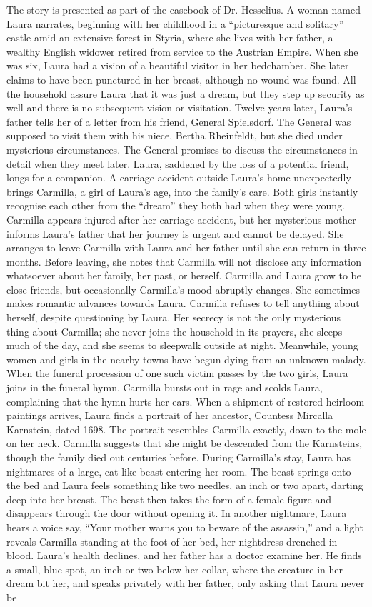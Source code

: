 \documentclass{article} %
\begin{document}
The story is presented as part of the casebook of Dr. Hesselius. A woman named Laura narrates, beginning with her childhood in a ``picturesque and solitary'' castle amid an extensive forest in Styria, where she lives with her father, a wealthy English widower retired from service to the Austrian Empire. When she was six, Laura had a vision of a beautiful visitor in her bedchamber. She later claims to have been punctured in her breast, although no wound was found. All the household assure Laura that it was just a dream, but they step up security as well and there is no subsequent vision or visitation. Twelve years later, Laura's father tells her of a letter from his friend, General Spielsdorf. The General was supposed to visit them with his niece, Bertha Rheinfeldt, but she died under mysterious circumstances. The General promises to discuss the circumstances in detail when they meet later. Laura, saddened by the loss of a potential friend, longs for a companion. A carriage accident outside Laura's home unexpectedly brings Carmilla, a girl of Laura's age, into the family's care. Both girls instantly recognise each other from the ``dream'' they both had when they were young. Carmilla appears injured after her carriage accident, but her mysterious mother informs Laura's father that her journey is urgent and cannot be delayed. She arranges to leave Carmilla with Laura and her father until she can return in three months. Before leaving, she notes that Carmilla will not disclose any information whatsoever about her family, her past, or herself. Carmilla and Laura grow to be close friends, but occasionally Carmilla's mood abruptly changes. She sometimes makes romantic advances towards Laura. Carmilla refuses to tell anything about herself, despite questioning by Laura. Her secrecy is not the only mysterious thing about Carmilla; she never joins the household in its prayers, she sleeps much of the day, and she seems to sleepwalk outside at night. Meanwhile, young women and girls in the nearby towns have begun dying from an unknown malady. When the funeral procession of one such victim passes by the two girls, Laura joins in the funeral hymn. Carmilla bursts out in rage and scolds Laura, complaining that the hymn hurts her ears. When a shipment of restored heirloom paintings arrives, Laura finds a portrait of her ancestor, Countess Mircalla Karnstein, dated 1698. The portrait resembles Carmilla exactly, down to the mole on her neck. Carmilla suggests that she might be descended from the Karnsteins, though the family died out centuries before. During Carmilla's stay, Laura has nightmares of a large, cat-like beast entering her room. The beast springs onto the bed and Laura feels something like two needles, an inch or two apart, darting deep into her breast. The beast then takes the form of a female figure and disappears through the door without opening it. In another nightmare, Laura hears a voice say, ``Your mother warns you to beware of the assassin,'' and a light reveals Carmilla standing at the foot of her bed, her nightdress drenched in blood. Laura's health declines, and her father has a doctor examine her. He finds a small, blue spot, an inch or two below her collar, where the creature in her dream bit her, and speaks privately with her father, only asking that Laura never be 
\end{document}
